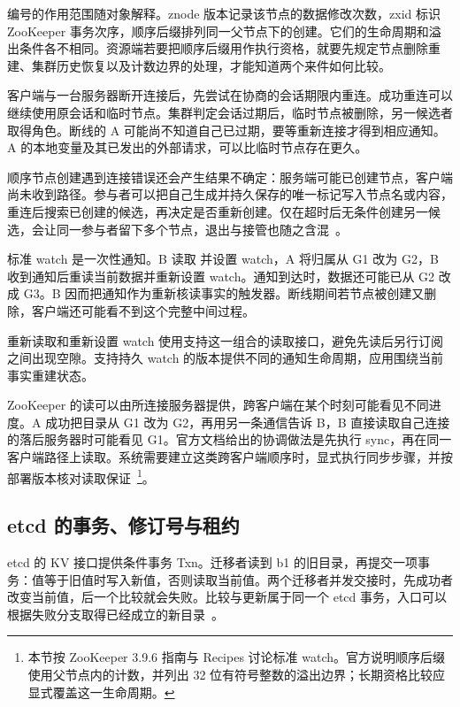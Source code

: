 编号的作用范围随对象解释。znode 版本记录该节点的数据修改次数，zxid 标识 ZooKeeper 事务次序，顺序后缀排列同一父节点下的创建。它们的生命周期和溢出条件各不相同。资源端若要把顺序后缀用作执行资格，就要先规定节点删除重建、集群历史恢复以及计数边界的处理，才能知道两个来件如何比较。

客户端与一台服务器断开连接后，先尝试在协商的会话期限内重连。成功重连可以继续使用原会话和临时节点。集群判定会话过期后，临时节点被删除，另一候选者取得角色。断线的 A 可能尚不知道自己已过期，要等重新连接才得到相应通知。A 的本地变量及其已发出的外部请求，可以比临时节点存在更久。

顺序节点创建遇到连接错误还会产生结果不确定：服务端可能已创建节点，客户端尚未收到路径。参与者可以把自己生成并持久保存的唯一标记写入节点名或内容，重连后搜索已创建的候选，再决定是否重新创建。仅在超时后无条件创建另一候选，会让同一参与者留下多个节点，退出与接管也随之含混~\cite{zk-396-recipes}。

标准 watch 是一次性通知。B 读取  并设置 watch，A 将归属从 G1 改为 G2，B 收到通知后重读当前数据并重新设置 watch。通知到达时，数据还可能已从 G2 改成 G3。B 因而把通知作为重新核读事实的触发器。断线期间若节点被创建又删除，客户端还可能看不到这个完整中间过程。


重新读取和重新设置 watch 使用支持这一组合的读取接口，避免先读后另行订阅之间出现空隙。支持持久 watch 的版本提供不同的通知生命周期，应用围绕当前事实重建状态。

ZooKeeper 的读可以由所连接服务器提供，跨客户端在某个时刻可能看见不同进度。A 成功把目录从 G1 改为 G2，再用另一条通信告诉 B，B 直接读取自己连接的落后服务器时可能看见 G1。官方文档给出的协调做法是先执行 sync，再在同一客户端路径上读取。系统需要建立这类跨客户端顺序时，显式执行同步步骤，并按部署版本核对读取保证~\cite{zk-396-programmer}\footnote{本节按 ZooKeeper 3.9.6 指南与 Recipes 讨论标准 watch。官方说明顺序后缀使用父节点内的计数，并列出 32 位有符号整数的溢出边界；长期资格比较应显式覆盖这一生命周期。}。

\subsection*{etcd 的事务、修订号与租约}

etcd 的 KV 接口提供条件事务 Txn。迁移者读到 b1 的旧目录，再提交一项事务：值等于旧值时写入新值，否则读取当前值。两个迁移者并发交接时，先成功者改变当前值，后一个比较就会失败。比较与更新属于同一个 etcd 事务，入口可以根据失败分支取得已经成立的新目录~\cite{etcd-37-api}。

